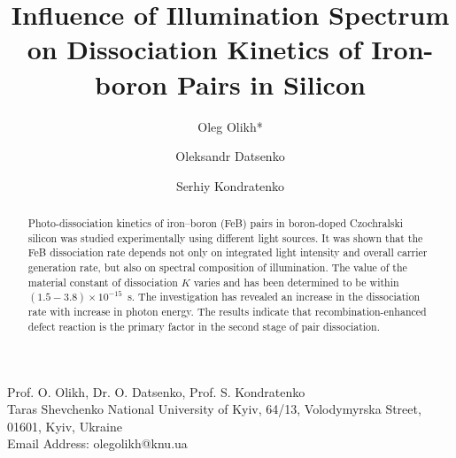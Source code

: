 \documentclass{WileyMSP-template}
\begin{document}
\pagestyle{fancy}


\title{Influence of Illumination Spectrum on Dissociation Kinetics of Iron-boron Pairs in Silicon}

\maketitle




\author{Oleg Olikh*}
\author{Oleksandr Datsenko}
\author{Serhiy Kondratenko}


\dedication{}






\begin{affiliations}
Prof. O. Olikh, Dr. O. Datsenko, Prof. S. Kondratenko\\
Taras Shevchenko National University of Kyiv, 64/13, Volodymyrska Street, 01601, Kyiv, Ukraine\\
Email Address: olegolikh@knu.ua


\end{affiliations}






\begin{abstract}

Photo-dissociation kinetics of iron–boron (FeB) pairs
in boron-doped Czochralski silicon was studied experimentally using different light sources.
It was shown that the FeB dissociation rate depends not only on integrated light intensity
and overall carrier generation rate, but also on spectral composition of illumination.
The value of the material constant of dissociation $K$ varies and has been determined to be within $(1.5-3.8)\times10^{-15}$~s.
The investigation has revealed an increase in the dissociation rate with increase in photon energy.
The results indicate that recombination-enhanced defect reaction is the primary factor in the second stage of pair dissociation.

\end{abstract}
\end{document}
